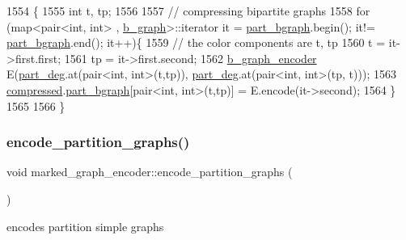\begin{DoxyCode}
1554 \{
1555   \textcolor{keywordtype}{int} t, tp;
1556 
1557   \textcolor{comment}{// compressing bipartite graphs }
1558   \textcolor{keywordflow}{for} (map<pair<int, int> , \hyperlink{classb__graph}{b\_graph}>::iterator it = \hyperlink{classmarked__graph__encoder_a5faebef707fb681c0b6c2ccf64abc04c}{part\_bgraph}.begin(); it!=
      \hyperlink{classmarked__graph__encoder_a5faebef707fb681c0b6c2ccf64abc04c}{part\_bgraph}.end(); it++)\{
1559     \textcolor{comment}{// the color components are t, tp}
1560     t = it->first.first; 
1561     tp = it->first.second; 
1562     \hyperlink{classb__graph__encoder}{b\_graph\_encoder} E(\hyperlink{classmarked__graph__encoder_a55ea2edb2609dfc287432f61900d6ad1}{part\_deg}.at(pair<int, int>(t,tp)),
      \hyperlink{classmarked__graph__encoder_a55ea2edb2609dfc287432f61900d6ad1}{part\_deg}.at(pair<int, int>(tp, t)));
1563     \hyperlink{classmarked__graph__encoder_ac2ded200860fdd2321f86dd76b28bcb3}{compressed}.\hyperlink{classmarked__graph__compressed_a7b3267063fba30b45eb21b3ba4e07536}{part\_bgraph}[pair<int, int>(t,tp)] = E.encode(it->second);
1564   \}
1565 
1566 \}
\end{DoxyCode}
\mbox{\label{classmarked__graph__encoder_a654463d4b256b84225f5944b5e361ebf}} 
\subsubsection{\texorpdfstring{encode\+\_\+partition\+\_\+graphs()}{encode\_partition\_graphs()}}
{\footnotesize\ttfamily void marked\+\_\+graph\+\_\+encoder\+::encode\+\_\+partition\+\_\+graphs (\begin{DoxyParamCaption}{ }\end{DoxyParamCaption})\hspace{0.3cm}{\ttfamily [private]}}



encodes partition simple graphs 



